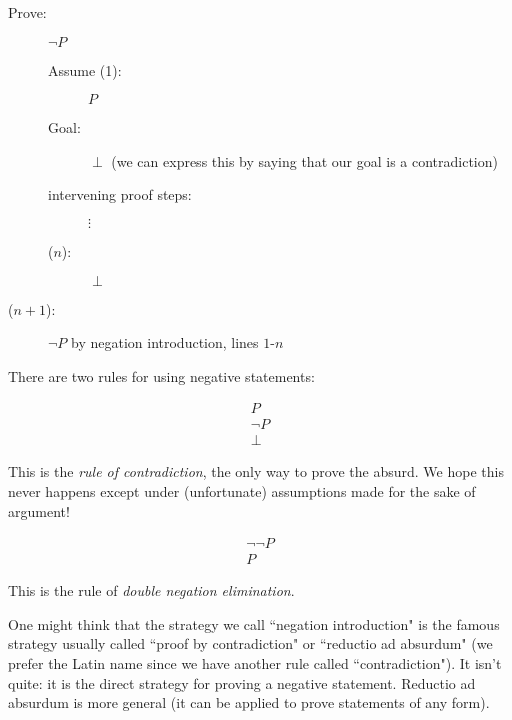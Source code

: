 \documentclass[12pt]{article}
\begin{document}
\begin{description}

\item[Prove:]  $\neg P$

\begin{description}

\item[Assume (1):]  $P$

\item[Goal:]  $\perp$ (we can express this by saying that our goal is a contradiction)

\item[intervening proof steps:]  $\vdots$

\item[($n$):]  $\perp$

\end{description}

\item[($n+1$):]  $\neg P$ by negation introduction, lines $1$-$n$

\end{description}

There are two rules for using negative statements:

$$\begin{array}{c}

P \\

\neg P \\ \hline

\perp

\end{array}$$

This is the {\em rule of contradiction\/}, the only way to prove the absurd.  We hope this never happens except under (unfortunate) assumptions made for the sake of argument!

$$\begin{array}{c}

\neg \neg P \\ \hline

P

\end{array}$$

This is the rule of {\em double negation elimination\/}.

One might think that the strategy we call ``negation introduction" is the famous strategy usually called ``proof by contradiction" or ``reductio ad absurdum" (we prefer the Latin name since we have another rule called ``contradiction").  It isn't quite:  it is the direct strategy for proving a negative statement.  Reductio ad absurdum is more general (it can be applied to prove statements of any form).
\end{document}
